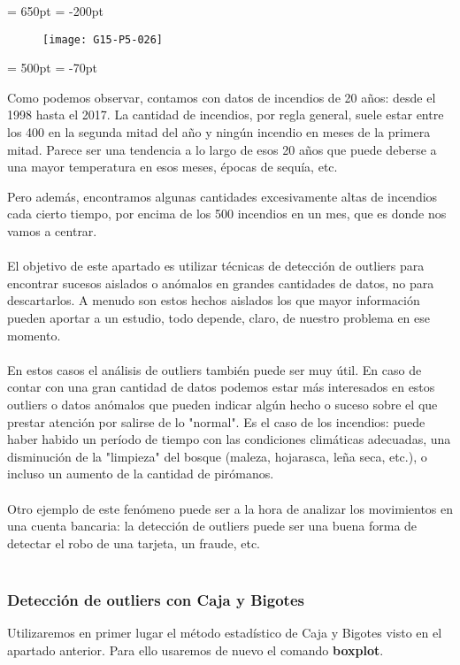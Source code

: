 \documentclass [a4paper] {article}
\begin{document}
\textwidth = 650pt
\hoffset = -200pt
\begin{figure}[h!]
\centering
\texttt{[image: G15-P5-026]}
\end{figure}
\textwidth = 500pt
\hoffset = -70pt

Como podemos observar, contamos con datos de incendios de 20 años: desde el 1998 hasta
el 2017. La cantidad de incendios, por regla general, suele estar entre los 400 en la
segunda mitad del año y ningún incendio en meses de la primera mitad. Parece ser una tendencia
a lo largo de esos 20 años que puede deberse a una mayor temperatura en esos meses, épocas de
sequía, etc.


Pero además, encontramos algunas cantidades excesivamente altas de incendios cada cierto
tiempo, por encima de los 500 incendios en un mes, que es donde nos vamos a centrar.
\\\\
El objetivo de este apartado es utilizar técnicas de detección de outliers para encontrar
sucesos aislados o anómalos en grandes cantidades de datos, no para descartarlos. A menudo
son estos hechos aislados los que mayor información pueden aportar a un estudio, todo depende,
claro, de nuestro problema en ese momento.
\\\\
En estos casos el análisis de outliers también puede ser muy útil. En caso de contar
con una gran cantidad de datos podemos estar más interesados en estos outliers o datos anómalos
que pueden indicar algún hecho o suceso sobre el que prestar atención por salirse
de lo "normal". Es el caso de los incendios: puede haber habido un período de tiempo
con las condiciones climáticas adecuadas, una disminución de la "limpieza" del bosque 
(maleza, hojarasca, leña seca, etc.), o incluso un aumento de la cantidad de pirómanos.
\\\\
Otro ejemplo de este fenómeno puede ser a la hora de analizar los movimientos en una
cuenta bancaria: la detección de outliers puede ser una buena forma de detectar el robo
de una tarjeta, un fraude, etc.
\\\\


\subsubsection{Detección de outliers con Caja y Bigotes}
Utilizaremos en primer lugar el método estadístico de Caja y Bigotes visto en el apartado
anterior. Para ello usaremos de nuevo el comando \textbf{boxplot}.
\end{document}
